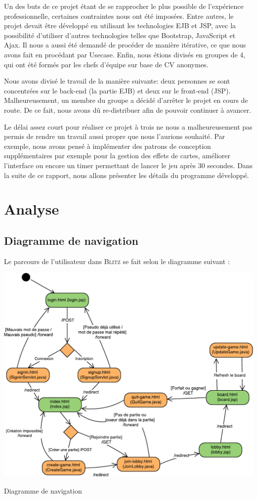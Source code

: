 \documentclass[11pt]{scrreprt}
\begin{document}
    Un des buts de ce projet étant de se rapprocher le plus possible de l'expérience professionnelle, certaines contraintes nous ont été imposées. Entre autres, le projet devait être développé en utilisant les technologies EJB et JSP, avec la possibilité d'utiliser d'autres technologies telles que Bootstrap, JavaScript et Ajax. Il nous a aussi été demandé de procéder de manière itérative, ce que nous avons fait en procédant par Usecase. Enfin, nous étions divisés en groupes de 4, qui ont été formés par les chefs d'équipe sur base de CV anonymes.

    Nous avons divisé le travail de la manière suivante: deux personnes se sont concentrées sur le back-end (la partie EJB) et deux sur le front-end (JSP). Malheureusement, un membre du groupe a décidé d'arrêter le projet en cours de route. De ce fait, nous avons dû re-distribuer afin de pouvoir continuer à avancer.

    Le délai assez court pour réaliser ce projet à trois ne nous a malheureusement pas permis de rendre un travail aussi propre que nous l'aurions souhaité. Par exemple, nous avons pensé à implémenter des patrons de conception supplémentaires par exemple pour la gestion des effets de cartes, améliorer l'interface ou encore un timer permettant de lancer le jeu après 30 secondes.
    Dans la suite de ce rapport, nous allons présenter les détails du programme développé.

    \chapter{Analyse}
    \section{Diagramme de navigation}
    Le parcours de l'utilisateur dans \textsc{Blitz} se fait selon le diagramme suivant :

    \begin{table}[H]
        \centering
        \includegraphics[width=\textwidth]{images/diag-nav.pdf}
        \caption{Diagramme de navigation}
    \end{table}
\end{document}
